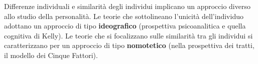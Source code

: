 \documentclass{subfiles}
\begin{document}
Differenze individuali e similarità degli individui implicano un approccio diverso allo studio della personalità.
Le teorie che sottolineano l'unicità dell'individuo adottano un approccio di tipo \textbf{ideografico}
(prospettiva psicoanalitica e quella cognitiva di Kelly).
Le teorie che si focalizzano sulle similarità tra gli individui si caratterizzano per un approccio di tipo \textbf{nomotetico}
(nella prospettiva dei tratti, il modello dei Cinque Fattori).
\end{document}
